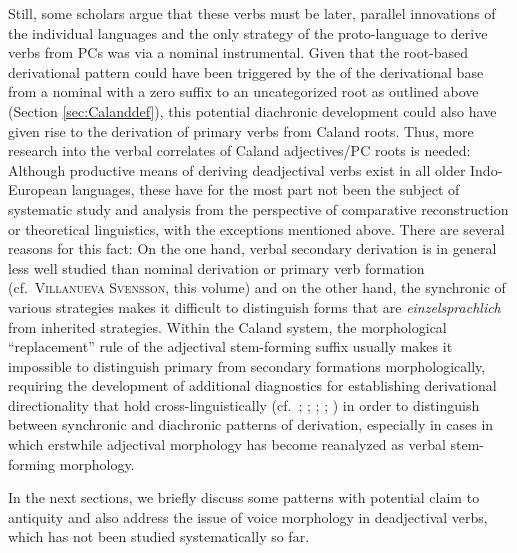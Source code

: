 \documentclass[output=paper,colorlinks,citecolor=brown]{langscibook}
\begin{document}
Still, some scholars argue that these verbs must be later, parallel innovations of the individual languages and the only strategy of the proto-language to derive verbs from PCs was via a nominal instrumental. Given that the  root-based derivational pattern  could have been triggered by the  of the derivational base from a nominal with a zero suffix to an uncategorized root as outlined above (Section \ref{sec:Calanddef}), this potential diachronic development could also have given rise to the derivation of primary verbs  from Caland roots. Thus, more research into the verbal  correlates of  Caland adjectives/PC roots is needed: Although productive means of deriving deadjectival verbs exist in all older Indo-European languages, these have for the most part not been the subject of systematic study and analysis from the perspective of comparative reconstruction or theoretical linguistics, with the exceptions mentioned above. There are several reasons for this fact: On the one hand, verbal secondary derivation is in general less well studied than nominal derivation or primary verb formation  (cf.\ \textsc{Villanueva Svensson}, this volume) and on the other hand, the synchronic  of various strategies makes it difficult to distinguish forms that are \emph{einzelsprachlich} from inherited strategies. Within the Caland system,  the morphological ``replacement'' rule of the adjectival stem-forming suffix usually makes it impossible to distinguish primary  from secondary formations morphologically, requiring the development of additional diagnostics for establishing derivational directionality that hold cross-linguistically (cf.\ \citealt{Marchand1964}; \citealt{Arad2003}; \citealt{Balteiro2007}; \citealt{Lohmann2017}; \citealt{GrestenbergerKastner2022}) in order to distinguish between synchronic and diachronic patterns of derivation, especially in cases in which erstwhile adjectival morphology has become reanalyzed as verbal stem-forming morphology.

In the next sections, we briefly discuss some patterns with potential claim to antiquity and also address the issue of voice morphology in deadjectival verbs, which has not been studied systematically so far. 
\end{document}

